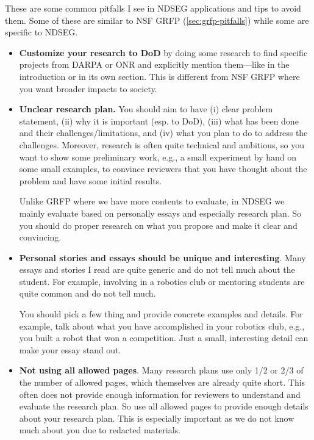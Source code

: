 \documentclass[oneside,11pt]{book}
\begin{document}
These are some common pitfalls I see in NDSEG applications and tips to avoid them.  Some of these are similar to NSF GRFP (\autoref{sec:grfp-pitfalls}) while some are specific to NDSEG.

\begin{itemize}

    \item \textbf{Customize your research to DoD} by doing some research to find specific projects from DARPA or ONR and explicitly mention them---like in the introduction or in its own section.  This is different from NSF GRFP where you want broader impacts to society.

    \item \textbf{Unclear research plan.}
     You should aim to have (i) clear problem statement, (ii) why it is important (esp. to DoD), (iii) what has been done and their challenges/limitations, and (iv) what you plan to do to address the challenges.  Moreover, research is often quite technical and ambitious, so you want to show some preliminary work, e.g., a small experiment by hand on some small examples, to convince reviewers that you have thought about the problem and have some initial results.
    
    
    Unlike GRFP where we have more contents to evaluate, in NDSEG we mainly evaluate based on personally essays and especially research plan. So you should do proper research on what you propose and make it clear and convincing.

    \item \textbf{Personal stories and essays should be unique and interesting}. Many essays and stories I read are quite generic and do not tell much about the student. For example, involving in a robotics club or mentoring students are quite common and do not tell much.
    
    You should pick a few thing and provide concrete examples and details.  For example, talk about what you have accomplished in your robotics club, e.g., you built a robot that won a competition.  Just a small, interesting detail can make your essay stand out.
    
    \item \textbf{Not using all allowed pages}. Many research plans use only 1/2 or 2/3 of the number of allowed pages, which themselves are already quite short. This often does not provide enough information for reviewers to understand and evaluate the research plan.  So use all allowed pages to provide enough details about your research plan. This is especially important as we do not know much about you due to redacted materials.
    


\end{itemize}
\end{document}
